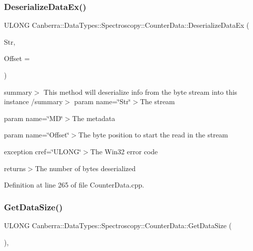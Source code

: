 \subsubsection{\texorpdfstring{Deserialize\+Data\+Ex()}{DeserializeDataEx()}}
{\footnotesize\ttfamily U\+L\+O\+NG Canberra\+::\+Data\+Types\+::\+Spectroscopy\+::\+Counter\+Data\+::\+Deserialize\+Data\+Ex (\begin{DoxyParamCaption}\item[{\hyperlink{class_canberra_1_1_utility_1_1_core_1_1_byte_stream}{Canberra\+::\+Utility\+::\+Core\+::\+Byte\+Stream} \&}]{Str,  }\item[{const L\+O\+NG}]{Offset = {} }\end{DoxyParamCaption})}

summary$>$ This method will deserialize info from the byte stream into this instance /summary$>$ param name=\char`\"{}\+Str\char`\"{}$>$The stream

param name=\char`\"{}\+M\+D\char`\"{}$>$The metadata

param name=\char`\"{}\+Offset\char`\"{}$>$The byte position to start the read in the stream

exception cref=\char`\"{}\+U\+L\+O\+N\+G\char`\"{}$>$The Win32 error code

returns$>$The number of bytes deserialized

Definition at line 265 of file Counter\+Data.\+cpp.

\mbox{\label{class_canberra_1_1_data_types_1_1_spectroscopy_1_1_counter_data_a7bc6005b442b7d0cbcf4a0b3e5cbc290_a7bc6005b442b7d0cbcf4a0b3e5cbc290}} 
\subsubsection{\texorpdfstring{Get\+Data\+Size()}{GetDataSize()}}
{\footnotesize\ttfamily U\+L\+O\+NG Canberra\+::\+Data\+Types\+::\+Spectroscopy\+::\+Counter\+Data\+::\+Get\+Data\+Size (\begin{DoxyParamCaption}{ }\end{DoxyParamCaption})\hspace{0.3cm}{\ttfamily [protected]}, {\ttfamily [virtual]}}

